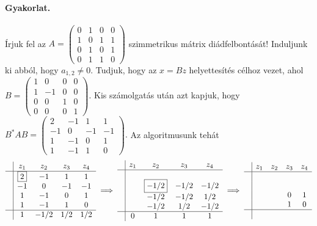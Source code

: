\documentclass[a4paper, showtrims]{memoir}
\theoremstyle{plain}
\theoremstyle{remark}
\theoremstyle{definition}
\begin{document}
\paragraph{Gyakorlat.}
Írjuk fel az 
\(
A=
\begin{pmatrix}
    0&1&0&0\\
    1&0&1&1\\
    0&1&0&1\\
    0&1&1&0
\end{pmatrix}
\)
szimmetrikus mátrix diádfelbontását!
Induljunk ki abból, hogy $a_{1,2}\neq 0$. Tudjuk, hogy az $x=Bz$ helyettesítés célhoz vezet, ahol
\(
B=
\begin{pmatrix}
    1&0&0&0\\
    1&-1&0&0\\
    0&0&1&0\\
    0&0&0&1
\end{pmatrix}.
\)
Kis számolgatás után azt kapjuk, hogy 
\(
B^\ast AB=
\begin{pmatrix}
    2&-1&1&1\\
    -1&0&-1&-1\\
    1&-1&0&1\\
    1&-1&1&0
\end{pmatrix}.
\)
Az algoritmusunk tehát
\[
\begin{array}{c|cccc}
     & z_1       & z_2 & z_3 & z_4\\
     \hline
     & \boxed{2} & -1   & 1 &1  \\
     & -1         & 0   & -1 &-1   \\
     & 1         & -1   & 0 &1  \\
     & 1         & -1   & 1 &0  \\
    \hline
    & 1     & -1/2   & 1/2 & 1/2
\end{array}
\implies
\begin{array}{c|cccc}
     & z_1& z_2  & z_3 &z_4 \\
     \hline
     & &                &  &   \\
     & & \boxed{-1/2}      & -1/2 &-1/2   \\
     & & -1/2              & -1/2 &1/2   \\
     & & -1/2              & 1/2 &-1/2   \\
     \hline
     &0 & 1         & 1 & 1
\end{array}
\implies
\begin{array}{c|cccc}
     & z_1 & z_2 & z_3 & z_4      \\
     \hline
     &     &     &     &      \\
     &     &     &     &      \\
     &     &     &  0  & 1 \\
     &     &     &  1  & 0 \\
    \hline
     &     &     &     &
\end{array}
\]
\end{document}
